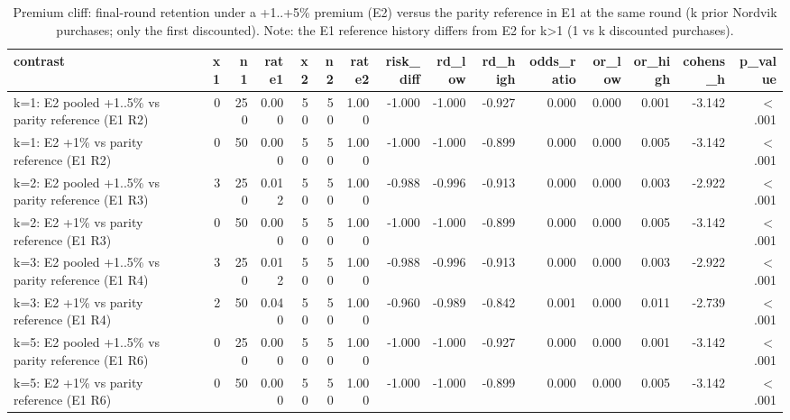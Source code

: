 \begin{table}[htbp]
\centering
\scriptsize
\caption{Premium cliff: final-round retention under a +1..+5\% premium (E2) versus the parity reference in E1 at the same round (k prior Nordvik purchases; only the first discounted). Note: the E1 reference history differs from E2 for k>1 (1 vs k discounted purchases).}
\label{tab:tab12_e2_premium_cliff}
\begin{tabular}{lrrrrrrrrrrrrrr}
\toprule
contrast & x1 & n1 & rate1 & x2 & n2 & rate2 & risk\_diff & rd\_low & rd\_high & odds\_ratio & or\_low & or\_high & cohens\_h & p\_value \\
\midrule
k=1: E2 pooled +1..5\% vs parity reference (E1 R2) & 0 & 250 & 0.000 & 50 & 50 & 1.000 & -1.000 & -1.000 & -0.927 & 0.000 & 0.000 & 0.001 & -3.142 & $<$.001 \\
k=1: E2 +1\% vs parity reference (E1 R2) & 0 & 50 & 0.000 & 50 & 50 & 1.000 & -1.000 & -1.000 & -0.899 & 0.000 & 0.000 & 0.005 & -3.142 & $<$.001 \\
k=2: E2 pooled +1..5\% vs parity reference (E1 R3) & 3 & 250 & 0.012 & 50 & 50 & 1.000 & -0.988 & -0.996 & -0.913 & 0.000 & 0.000 & 0.003 & -2.922 & $<$.001 \\
k=2: E2 +1\% vs parity reference (E1 R3) & 0 & 50 & 0.000 & 50 & 50 & 1.000 & -1.000 & -1.000 & -0.899 & 0.000 & 0.000 & 0.005 & -3.142 & $<$.001 \\
k=3: E2 pooled +1..5\% vs parity reference (E1 R4) & 3 & 250 & 0.012 & 50 & 50 & 1.000 & -0.988 & -0.996 & -0.913 & 0.000 & 0.000 & 0.003 & -2.922 & $<$.001 \\
k=3: E2 +1\% vs parity reference (E1 R4) & 2 & 50 & 0.040 & 50 & 50 & 1.000 & -0.960 & -0.989 & -0.842 & 0.001 & 0.000 & 0.011 & -2.739 & $<$.001 \\
k=5: E2 pooled +1..5\% vs parity reference (E1 R6) & 0 & 250 & 0.000 & 50 & 50 & 1.000 & -1.000 & -1.000 & -0.927 & 0.000 & 0.000 & 0.001 & -3.142 & $<$.001 \\
k=5: E2 +1\% vs parity reference (E1 R6) & 0 & 50 & 0.000 & 50 & 50 & 1.000 & -1.000 & -1.000 & -0.899 & 0.000 & 0.000 & 0.005 & -3.142 & $<$.001 \\
\bottomrule
\end{tabular}
\end{table}